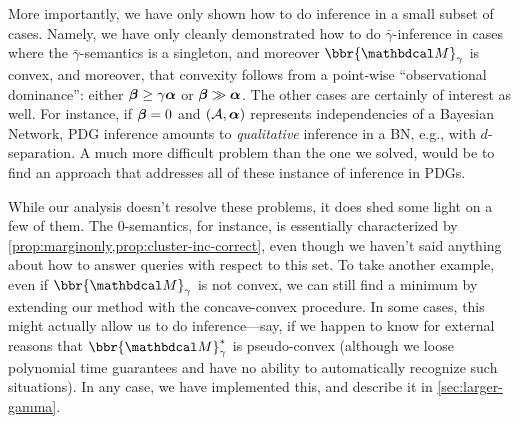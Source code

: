 \documentclass{article}
\newcommand\zogamma{{\bar\gamma}}
\begin{document}
More importantly, we have only shown how to do inference in a small subset of cases. 
Namely, we have only cleanly demonstrated how to do $\zogamma$-inference in cases where the $\zogamma$-semantics is a singleton, and moreover $\bbr{\dg M}_{\gamma}$ is convex, and moreover, that convexity follows from a point-wise ``observational dominance'': either $\boldsymbol\beta \ge \gamma \boldsymbol\alpha$ or $\boldsymbol\beta \gg \boldsymbol\alpha$. 
The other cases are certainly of interest as well. For instance, if $\boldsymbol\beta = 0$ and $(\mathcal A, \boldsymbol\alpha)$ represents independencies of a Bayesian Network, PDG inference amounts to \emph{qualitative} inference in a BN, e.g., with $d$-separation. 
A much more difficult problem than the one we solved, would be to find an approach that addresses all of these instance of inference in PDGs.
 
While our analysis doesn't resolve these problems, it
does shed some light on a few of them.  
The $0$-semantics, for instance, is essentially characterized by \cref{prop:marginonly,prop:cluster-inc-correct}, even though we haven't said anything about how to answer queries with respect to this set.
To take another example, even if $\bbr{\dg M}_\gamma$ is not convex, we can still find a minimum by extending our method with the concave-convex procedure. 
In some cases, this might actually allow us to do inference---say, if we happen to know for external reasons that $\bbr{\dg M}^*_\gamma$ is pseudo-convex (although we loose polynomial time guarantees and have no ability to automatically recognize such situations). In any case, we have implemented this, and describe it in \cref{sec:larger-gamma}.


\end{document}

